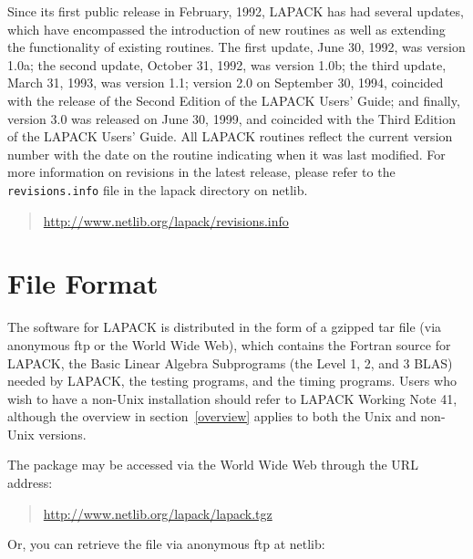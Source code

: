 \documentclass[11pt]{report}
\begin{document}
Since its first public release in February, 1992, LAPACK has had
several updates, which have encompassed the introduction of new routines
as well as extending the functionality of existing routines.  The first
update,
June 30, 1992, was version 1.0a; the second update, October 31, 1992,
was version 1.0b; the third update, March 31, 1993, was version 1.1;
version 2.0 on September 30, 1994, coincided with the release of the
Second Edition of the LAPACK Users' Guide; and finally, version 3.0 was
released on June 30, 1999, and coincided with the Third Edition of
the LAPACK Users' Guide.
All LAPACK routines reflect the current version number with the date
on the routine indicating when it was last modified.
For more information on revisions in the latest release, please refer
to the \texttt{revisions.info} file in the lapack directory on netlib.
\begin{quote}
\url{http://www.netlib.org/lapack/revisions.info}
\end{quote}

%

\section{File Format}\label{fileformat}

The software for LAPACK is distributed in the form of a
gzipped tar file (via anonymous ftp or the World Wide Web),
which contains the Fortran source for LAPACK,
the Basic Linear Algebra Subprograms
(the Level 1, 2, and 3 BLAS) needed by LAPACK, the testing programs,
and the timing programs.
Users who wish to have a non-Unix installation should refer to LAPACK
Working Note 41,
although the overview in section~\ref{overview} applies to both the Unix and non-Unix
versions.

The package may be accessed via the World Wide Web through
the URL address:
\begin{quote}
\url{http://www.netlib.org/lapack/lapack.tgz}
\end{quote}

Or, you can retrieve the file via anonymous ftp at netlib:
\end{document}
